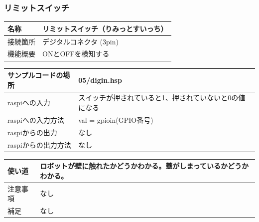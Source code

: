 \subsubsection{リミットスイッチ}\label{lmswitch}
\begin{table}[H]
	\begin{tabular}{|p{\colF}|p{\colG}|}	\hline
	名称 & リミットスイッチ（りみっとすいっち）\\ \hline
	接続箇所 & デジタルコネクタ (3pin)\\ \hline
	機能概要 & ONとOFFを検知する\\ \hline
  \end{tabular}
\end{table}

\begin{table}[H]
	\begin{tabular}{|p{\colF}|p{\colG}|}	\hline
	サンプルコードの場所 & 05/digin.hsp\\ \hline
	raspiへの入力 & スイッチが押されていると1、押されていないと0の値になる\\ \hline
	raspiへの入力方法 & val = gpioin(GPIO番号)\\ \hline
	raspiからの出力 & なし\\ \hline
	raspiからの出力方法 & なし\\ \hline
  \end{tabular}
\end{table}

\begin{table}[H]
	\begin{tabular}{|p{\colF}|p{\colG}|} \hline
	使い道 & ロボットが壁に触れたかどうかわかる。蓋がしまっているかどうかわかる。\\ \hline
	注意事項 & なし\\ \hline
	補足 & なし\\ \hline
  \end{tabular}
\end{table}

